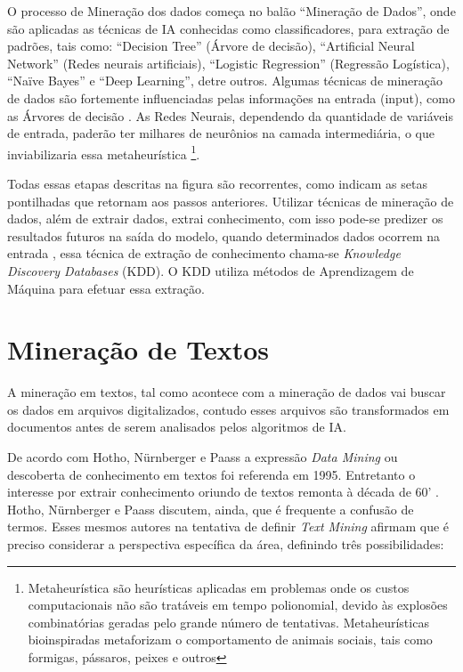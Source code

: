 O processo de Mineração dos dados começa no balão ``Mineração de Dados'', onde são aplicadas as técnicas de IA conhecidas como classificadores, para extração de padrões, tais como: 
``Decision Tree'' (Árvore de decisão), ``Artificial Neural Network'' (Redes neurais artificiais), ``Logistic Regression'' (Regressão Logística), ``Naïve Bayes'' e ``Deep Learning'', detre outros.
Algumas técnicas de mineração de dados são fortemente influenciadas pelas informações na entrada (input), como as Árvores de decisão \cite{DecisionTree}. 
As Redes Neurais, dependendo da quantidade de variáveis de entrada, paderão ter milhares de neurônios na camada intermediária, o que inviabilizaria essa metaheurística 
\footnote{Metaheurística são heurísticas aplicadas em problemas onde os custos computacionais não são tratáveis em tempo polionomial, devido às explosões combinatórias geradas
pelo grande número de tentativas. Metaheurísticas bioinspiradas metaforizam o comportamento de animais sociais, tais como formigas, pássaros, peixes e outros}.

Todas essas etapas descritas na figura são recorrentes, como indicam as setas pontilhadas que retornam aos passos anteriores.
Utilizar técnicas de mineração de dados, além de extrair dados, extrai conhecimento, com isso pode-se predizer os resultados futuros na saída do modelo, 
quando determinados dados ocorrem na entrada \cite{Amin2015a}, essa técnica de extração de conhecimento chama-se \textit{Knowledge Discovery Databases} (KDD).
O KDD utiliza métodos de Aprendizagem de Máquina para efetuar essa extração.


\pagebreak


\section{Mineração de Textos} %

A mineração em textos, tal como acontece com a mineração de dados vai buscar os dados em arquivos digitalizados, contudo esses arquivos são transformados em documentos antes de serem analisados pelos algoritmos de IA.

De acordo com Hotho, Nürnberger e Paass  \cite{hotho2005brief} a expressão \textit{Data Mining} ou descoberta de conhecimento em textos foi referenda em 1995. Entretanto o interesse por extrair conhecimento oriundo de textos remonta à década de 60' \cite{stone1968general}. Hotho, Nürnberger e Paass  \cite{hotho2005brief} discutem, ainda, que é frequente a confusão de termos. Esses mesmos autores \cite{hotho2005brief} na tentativa de definir \textit{Text Mining} afirmam que é preciso considerar a perspectiva específica da área, definindo três possibilidades:


